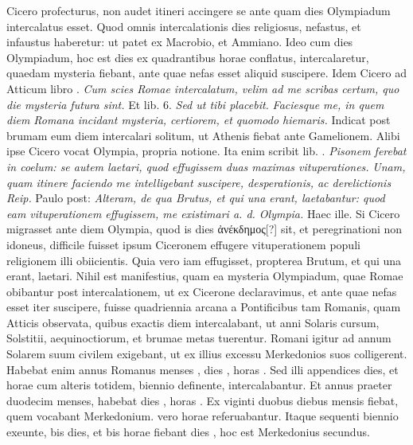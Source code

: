 Cicero
profecturus, non audet itineri accingere se ante quam dies Olympiadum
intercalatus esset.
Quod omnis intercalationis dies religiosus,
nefastus, et infaustus haberetur: ut patet ex Macrobio, et Ammiano.
Ideo cum dies Olympiadum, hoc est dies ex quadrantibus horae
conflatus, intercalaretur, quaedam mysteria fiebant, ante quae nefas
esset aliquid suscipere.
Idem Cicero ad Atticum libro .
\textit{Cum scies
Romae intercalatum, velim ad me scribas certum, quo die mysteria
futura sint.}
Et lib. 6.
\textit{Sed ut tibi placebit.}
\textit{Faciesque me, in quem diem
Romana incidant mysteria, certiorem, et quomodo hiemaris.}
Indicat
post brumam eum diem intercalari solitum, ut Athenis fiebat ante
Gamelionem.
Alibi ipse Cicero vocat Olympia, propria notione.
Ita enim scribit lib. .
\textit{Pisonem ferebat in coelum: se autem laetari,
quod effugissem duas maximas vituperationes.}
\textit{Unam, quam itinere
faciendo me intelligebant suscipere, desperationis, ac derelictionis Reip.}
Paulo post: \textit{Alteram, de qua Brutus,
 et qui una erant, laetabantur:
quod eam vituperationem effugissem, me existimari a. d. Olympia.}
Haec
ille.
Si Cicero migrasset ante diem Olympia, quod is dies
 \textgreek{ἀνέκδημος[?]}
sit, et peregrinationi non idoneus, difficile fuisset ipsum Ciceronem
effugere vituperationem populi religionem illi obiicientis.
Quia vero
iam effugisset, propterea Brutum, et qui una erant, laetari.
Nihil est
manifestius, quam ea mysteria Olympiadum, quae Romae obibantur
post intercalationem, ut ex Cicerone declaravimus, et ante quae
nefas esset iter suscipere, fuisse quadriennia arcana a Pontificibus tam
Romanis, quam Atticis observata, quibus exactis diem intercalabant,
ut anni Solaris cursum, Solstitii, aequinoctiorum, et brumae
metas tuerentur.
Romani igitur ad annum Solarem suum civilem exigebant,
ut ex illius excessu Merkedonios suos colligerent.
Habebat
enim annus Romanus menses , dies , horas .
Sed illi appendices
dies, et horae cum alteris totidem, biennio definente, intercalabantur.
Et annus praeter duodecim menses, habebat dies , horas
.
Ex viginti duobus diebus mensis fiebat, quem vocabant
Merkedonium.
 vero horae referuabantur.
Itaque sequenti biennio
exeunte, bis  dies, et bis  horae fiebant dies ,
 hoc
est Merkedonius secundus.
